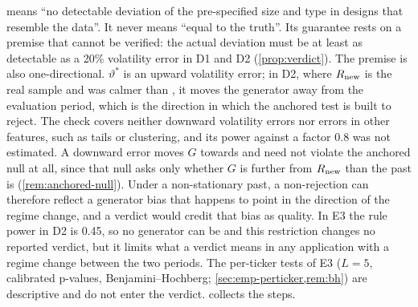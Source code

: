 \GOOD{} means ``no detectable deviation of the pre-specified size and type in designs that
resemble the data''. It never means ``equal to the truth''. Its guarantee rests on a premise
that cannot be verified: the actual deviation must be at least as detectable as a 20\%
volatility error in D1 and D2 (\cref{prop:verdict}). The premise is also one-directional.
$\vartheta^*$ is an upward volatility error; in D2, where $R_{\mathrm{new}}$ is the real \TEST{} sample and
\TEST{} was calmer than \TRAIN{}, it moves the generator away from the evaluation period, which
is the direction in which the anchored test is built to reject. The check covers neither
downward volatility errors nor errors in other features, such as tails or clustering, and its
power against a factor 0.8 was not estimated. A downward
error moves $G$ towards \TEST{} and need not violate the anchored null at all, since that null
asks only whether $G$ is further from $R_{\mathrm{new}}$ than the past is (\cref{rem:anchored-null}). Under
a non-stationary past, a non-rejection can therefore reflect a generator bias that happens to
point in the direction of the regime change, and a \GOOD{} verdict would credit that bias as
quality. In E3 the rule power in D2 is 0.45, so no generator can be \GOOD{} and this restriction
changes no reported verdict, but it limits what a \GOOD{} verdict means in any application with
a regime change between the two periods. The per-ticker tests of E3 ($L=5$,
calibrated p-values, Benjamini--Hochberg; \cref{sec:emp-perticker,rem:bh}) are descriptive and
do not enter the verdict.  collects the steps.

